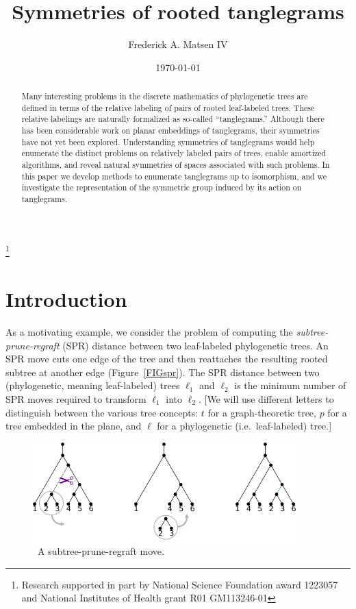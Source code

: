 \documentclass{amsart}
\newcommand{\arxiv}[1]{#1}
\newcommand{\FIGspr}{\
\label{FIGspr}
\begin{figure}
  \arxiv{\includegraphics[width=4in]{figures/spr-definition}}
\caption{\
  A subtree-prune-regraft move.
}
\end{figure}
}
\begin{document}
\title{Symmetries of rooted tanglegrams}
\author[Matsen]{Frederick A. Matsen IV}
\address{Fred Hutchinson Cancer Research Center \\ Seattle, WA}
\thanks{Research supported in part by National Science Foundation award 1223057 and National Institutes of Health grant R01 GM113246-01}


\date{\today}

\begin{abstract}
Many interesting problems in the discrete mathematics of phylogenetic trees are defined in terms of the relative labeling of pairs of rooted leaf-labeled trees.
These relative labelings are naturally formalized as so-called ``tanglegrams.''
Although there has been considerable work on planar embeddings of tanglegrams, their symmetries have not yet been explored.
Understanding symmetries of tanglegrams would help enumerate the distinct problems on relatively labeled pairs of trees, enable amortized algorithms, and reveal natural symmetries of spaces associated with such problems.
In this paper we develop methods to enumerate tanglegrams up to isomorphism, and we investigate the representation of the symmetric group induced by its action on tanglegrams.
\end{abstract}

\maketitle


\section{Introduction}
As a motivating example, we consider the problem of computing the \emph{subtree-prune-regraft} (SPR) distance between two leaf-labeled phylogenetic trees.
An SPR move cuts one edge of the tree and then reattaches the resulting rooted subtree at another edge (Figure~\ref{FIGspr}).
The SPR distance between two (phylogenetic, meaning leaf-labeled) trees $\ell_1$ and $\ell_2$ is the minimum number of SPR moves required to transform $\ell_1$ into $\ell_2$.
[We will use different letters to distinguish between the various tree concepts: $t$ for a graph-theoretic tree, $p$ for a tree embedded in the plane, and $\ell$ for a phylogenetic (i.e.\ leaf-labeled) tree.]
\FIGspr
\end{document}
